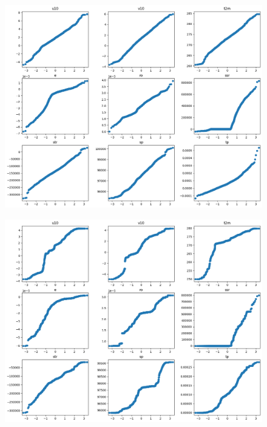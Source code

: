 \begin{figure}[H]
    \centering
    \includegraphics[width=\textwidth]{images/svr_qq.png}
    \caption{}
    \label{svr-qq}
\end{figure}

\begin{figure}[H]
    \centering
    \includegraphics[width=\textwidth]{images/dt_qq.png}
    \caption{}
    \label{dt-qq}
\end{figure}

